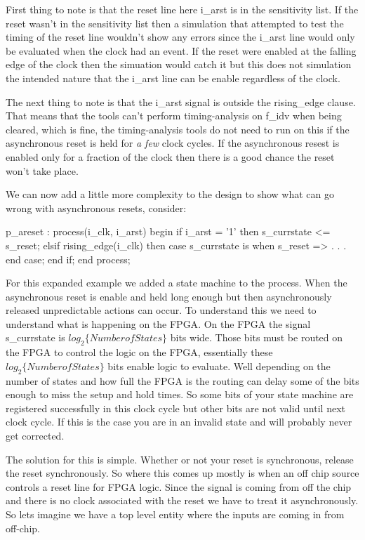 First thing to note is that the reset line here i\_arst is in the sensitivity list. If the reset wasn't in the sensitivity list then a simulation that attempted to test the timing of the reset line wouldn't show any errors since the i\_arst line would only be evaluated when the clock had an event. If the reset were enabled at the falling edge of the clock then the simuation would catch it but this does not simulation the intended nature that the i\_arst line can be enable regardless of the clock. 

The next thing to note is that the i\_arst signal is outside the rising\_edge clause. That means that the tools can't perform timing-analysis on f\_idv when being cleared, which is fine, the timing-analysis tools do not need to run on this if the asynchronous reset is held for \emph{a few} clock cycles. If the asynchronous resest is enabled only for a fraction of the clock then there is a good chance the reset won't take place. 

We can now add a little more complexity to the design to show what can go wrong with asynchronous resets, consider:

\begin{VHDLlisting}[tabsize=4]
p_areset : process(i_clk, i_arst)
begin
	if i_arst = '1' then
		s_currstate <= s_reset;
	elsif rising_edge(i_clk) then
		case s_currstate is
			when s_reset => 
			.
			.
			.
		end case;
	end if;
end process;
\end{VHDLlisting}

For this expanded example we added a state machine to the process. When the asynchronous reset is enable and held long enough but then asynchronously released unpredictable actions can occur. To understand this we need to understand what is happening on the \ac{FPGA}. On the \ac{FPGA} the signal s\_currstate is $log_2\{Number of States\}$ bits wide. Those bits must be routed on the \ac{FPGA} to control the logic on the \ac{FPGA}, essentially these $log_2\{Number of States\}$ bits enable logic to evaluate. Well depending on the number of states and how full the \ac{FPGA} is the routing can delay some of the bits enough to miss the setup and hold times. So some bits of your state machine are registered successfully in this clock cycle but other bits are not valid until next clock cycle. If this is the case you are in an invalid state and will probably never get corrected. 

The solution for this is simple. Whether or not your reset is synchronous, release the reset synchronously. So where this comes up mostly is when an off chip source controls a reset line for \ac{FPGA} logic. Since the signal is coming from off the chip and there is no clock associated with the reset we have to treat it asynchronously. So lets imagine we have a top level entity where the inputs are coming in from off-chip. 

